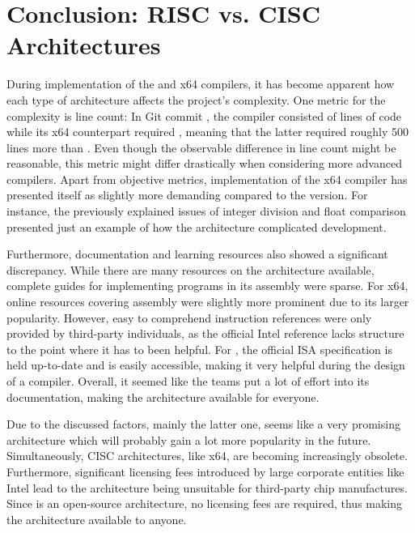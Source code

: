\section{Conclusion: RISC vs. CISC Architectures}

During implementation of the \riscv{} and x64 compilers, it has become apparent how each type of architecture affects the project's  complexity.
One metric for the complexity is line count:
In Git commit \rushCommit{}, the \riscv{} compiler consisted of  lines of code while
its x64 counterpart required , meaning that the latter required roughly 500 lines more than \riscv{}.
Even though the observable difference in line count might be reasonable, this metric might differ drastically when considering more advanced compilers.
Apart from objective metrics, implementation of the x64 compiler has presented itself as slightly more demanding compared to the \riscv{} version.
For instance, the previously explained issues of integer division and float comparison presented just an example of how the architecture complicated development.

Furthermore, documentation and learning resources also showed a significant discrepancy.
While there are many resources on the \riscv{} architecture available,
complete guides for implementing programs in its assembly were sparse.
For x64, online resources covering assembly were slightly more prominent due to its larger popularity.
However, easy to comprehend instruction references were only provided by third-party individuals,
as the official Intel reference lacks structure to the point where it has to been helpful. 
For \riscv{}, the official ISA specification is held up-to-date and is easily accessible,
making it very helpful during the design of a compiler.
Overall, it seemed like the \riscv{} teams put a lot of effort into its documentation,
making the architecture available for everyone.

Due to the discussed factors, mainly the latter one,
\riscv{} seems like a very promising architecture which will probably gain a lot more popularity in the future.
Simultaneously, CISC architectures, like x64, are becoming increasingly obsolete.
Furthermore, significant licensing fees introduced by large corporate entities like Intel
lead to the architecture being unsuitable for third-party chip manufactures.
Since \riscv{} is an open-source architecture, no licensing fees are required,
thus making the architecture available to anyone.

